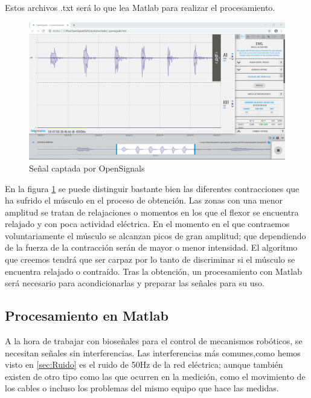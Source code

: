 Estos archivos .txt será lo que lea Matlab para realizar el procesamiento. \newline


\begin{figure}[H]
	\center
	\includegraphics[scale=0.3]{imagenes/Disenodelsistema/ejemplo.png}
	\caption{Señal captada por OpenSignals}
	\label{fig:ejemplo}
\end{figure}



En la figura \ref{fig:ejemplo} se puede distinguir bastante bien las diferentes contracciones que ha sufrido el músculo en el proceso de obtención. Las zonas con una menor amplitud se tratan de relajaciones o momentos en los que el flexor se encuentra relajado y con poca actividad eléctrica. En el momento en el que contraemos voluntariamente el músculo se alcanzan picos de gran amplitud; que dependiendo de la fuerza de la contracción serán de mayor o menor intensidad. El algoritmo que creemos tendrá que ser carpaz por lo tanto de discriminar si el músculo se encuentra relajado o contraído.
Tras la obtención, un procesamiento con Matlab será necesario para acondicionarlas y preparar las señales para su uso.


\subsection{Procesamiento en Matlab}

A la hora de trabajar con bioseñales para el control de mecanismos robóticos, se necesitan señales sin interferencias. Las interferencias más comunes,como hemos visto en \ref{sec:Ruido} es el ruido de 50Hz de la red eléctrica; aunque también existen de otro tipo como las que ocurren en la medición, como el movimiento de los cables o incluso los problemas del mismo equipo que hace las medidas. \newline 


